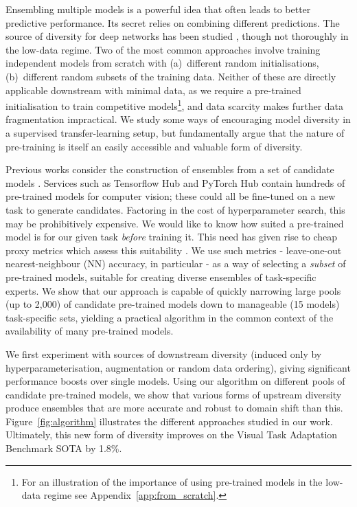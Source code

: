 \documentclass{article} \usepackage{iclr2021_conference,times}
\begin{document}
Ensembling multiple models is a powerful idea that often leads to better predictive performance.
Its secret relies on combining different predictions.
The source of diversity for deep networks has been studied \citep{fort2019deep,wenzel2020hyperparameter}, though not thoroughly in the low-data regime.
Two of the most common approaches involve training independent models from scratch with (a)~different random initialisations, (b)~different random subsets of the training data.
Neither of these are directly applicable downstream with minimal data, as we require a pre-trained initialisation to train competitive models\footnote{For an illustration of the importance of using pre-trained models in the low-data regime see Appendix~\ref{app:from_scratch}.}, and data scarcity makes further data fragmentation impractical.
We study some ways of encouraging model diversity in a supervised transfer-learning setup, but fundamentally argue that the nature of pre-training is itself an easily accessible and valuable form of diversity.

Previous works consider the construction of ensembles from a set of candidate models \citep{caruana2004ensembleselection}. Services such as Tensorflow Hub \citep{tfhub} and PyTorch Hub \citep{pytorch-hub} contain hundreds of pre-trained models for computer vision; these could all be fine-tuned on a new task to generate candidates. Factoring in the cost of hyperparameter search, this may be prohibitively expensive. We would like to know how suited a pre-trained model is for our given task \emph{before} training it. This need has given rise to cheap proxy metrics which assess this suitability \citep{puigcerver2020experts}. We use such metrics - leave-one-out nearest-neighbour (NN) accuracy, in particular - as a way of selecting a \textit{subset} of pre-trained models, suitable for creating diverse ensembles of task-specific experts. We show that our approach is capable of quickly narrowing large pools (up to 2,000) of candidate pre-trained models down to manageable (15 models) task-specific sets, yielding a practical algorithm in the common context of the availability of many pre-trained models.

We first experiment with sources of downstream diversity (induced only by hyperparameterisation, augmentation or random data ordering), giving significant performance boosts over single models. Using our algorithm on different pools of candidate pre-trained models, we show that various forms of upstream diversity produce ensembles that are more accurate and robust to domain shift than this. Figure~\ref{fig:algorithm} illustrates the different approaches studied in our work. Ultimately, this new form of diversity improves on the Visual Task Adaptation Benchmark \citep{zhai2019largescale} SOTA by 1.8\%.
\end{document}
